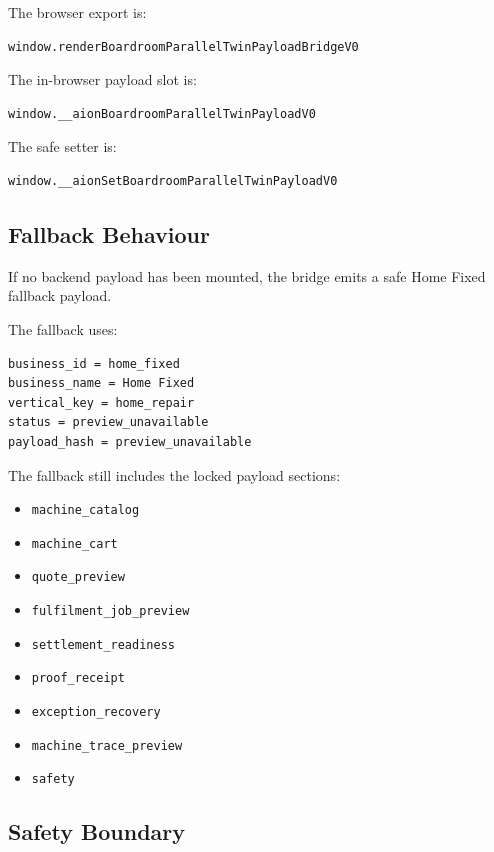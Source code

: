 The browser export is:

\begin{verbatim}
window.renderBoardroomParallelTwinPayloadBridgeV0
\end{verbatim}

The in-browser payload slot is:

\begin{verbatim}
window.__aionBoardroomParallelTwinPayloadV0
\end{verbatim}

The safe setter is:

\begin{verbatim}
window.__aionSetBoardroomParallelTwinPayloadV0
\end{verbatim}

\subsection{Fallback Behaviour}

If no backend payload has been mounted, the bridge emits a safe Home Fixed fallback payload.

The fallback uses:

\begin{verbatim}
business_id = home_fixed
business_name = Home Fixed
vertical_key = home_repair
status = preview_unavailable
payload_hash = preview_unavailable
\end{verbatim}

The fallback still includes the locked payload sections:

\begin{itemize}
  \item \texttt{machine\_catalog}
  \item \texttt{machine\_cart}
  \item \texttt{quote\_preview}
  \item \texttt{fulfilment\_job\_preview}
  \item \texttt{settlement\_readiness}
  \item \texttt{proof\_receipt}
  \item \texttt{exception\_recovery}
  \item \texttt{machine\_trace\_preview}
  \item \texttt{safety}
\end{itemize}

\subsection{Safety Boundary}

